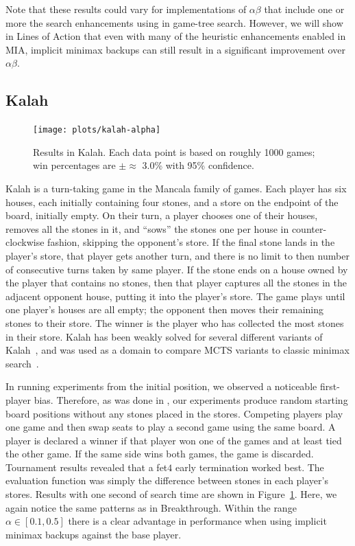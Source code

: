 \documentclass[conference]{IEEEtran}
\begin{document}
Note that these results could vary for implementations of $\alpha\beta$ that include one or more the 
search enhancements using in game-tree search.
However, we will show in Lines of Action that even with many of the heuristic enhancements enabled 
in MIA, implicit minimax backups can still result in a significant improvement over $\alpha\beta$. 

\subsection{Kalah}

\begin{figure}
\begin{center}
\texttt{[image: plots/kalah-alpha]}
\caption{Results in Kalah. Each data point is based on roughly 1000 games; win percentages are $\pm \approx$ 3.0\% 
with 95\% confidence.}
\label{fig:loa-alpha}
\end{center}
\end{figure}

Kalah is a turn-taking game in the Mancala family of games. Each player has six houses, each 
initially containing four stones, and a store on the endpoint of the board, initially empty. 
On their turn, a player chooses one of their houses, removes all the stones in it, and ``sows'' 
the stones one per house in counter-clockwise fashion, skipping the opponent's store. 
If the final stone lands in the player's store, that player gets another turn, and there is no 
limit to then number of consecutive turns taken by same player. If the stone ends on a house owned
by the player that contains no stones, then that player captures all the stones in the adjacent 
opponent house, putting it into the player's store. The game plays until one player's houses are
all empty; the opponent then moves their remaining stones to their store. The winner is the player
who has collected the most stones in their store. 
Kalah has been weakly solved for several different variants of Kalah~\cite{Irving00Solving}, 
and was used as a domain to compare MCTS variants to classic minimax search~\cite{Ramanujan11Tradeoffs}.

In running experiments from the initial position, we observed a noticeable first-player bias. Therefore, as
was done in \cite{Ramanujan11Tradeoffs}, our experiments produce random starting board positions 
without any stones placed in the stores. 
Competing players play one game and then swap seats to play a second game using the same board. A player 
is declared a winner if that player won one of the games and at least tied the other game. If the same side 
wins both games, the game is discarded. 
Tournament results revealed that a fet$4$ early termination worked best. 
The evaluation function was simply the difference between stones in each player's stores. Results with one 
second of search time are shown in Figure~\ref{fig:loa-alpha}. 
Here, we again notice the same patterns as in Breakthrough. Within the range $\alpha \in [0.1,0.5]$ there is a clear 
advantage in performance when using implicit minimax backups against the base player. 
\end{document}
